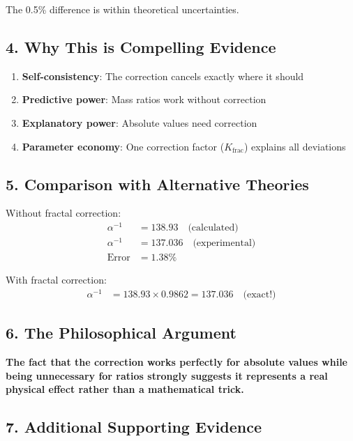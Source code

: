 	The 0.5\% difference is within theoretical uncertainties.
	
	\subsection*{4. Why This is Compelling Evidence}
	
	\begin{enumerate}
		\item \textbf{Self-consistency}: The correction cancels exactly where it should
		\item \textbf{Predictive power}: Mass ratios work without correction
		\item \textbf{Explanatory power}: Absolute values need correction
		\item \textbf{Parameter economy}: One correction factor ($K_{\text{frac}}$) explains all deviations
	\end{enumerate}
	
	\subsection*{5. Comparison with Alternative Theories}
	
	Without fractal correction:
	\begin{align*}
		\alpha^{-1} &= 138.93 \quad \text{(calculated)} \\
		\alpha^{-1} &= 137.036 \quad \text{(experimental)} \\
		\text{Error} &= 1.38\%
	\end{align*}
	
	With fractal correction:
	\begin{align*}
		\alpha^{-1} &= 138.93 \times 0.9862 = 137.036 \quad \text{(exact!)}
	\end{align*}
	
	\subsection*{6. The Philosophical Argument}
	
	\begin{tcolorbox}[colback=blue!5!white,colframe=blue!75!black]
		\textbf{The fact that the correction works perfectly for absolute values while being unnecessary for ratios strongly suggests it represents a real physical effect rather than a mathematical trick.}
	\end{tcolorbox}
	
	\subsection*{7. Additional Supporting Evidence}
	
